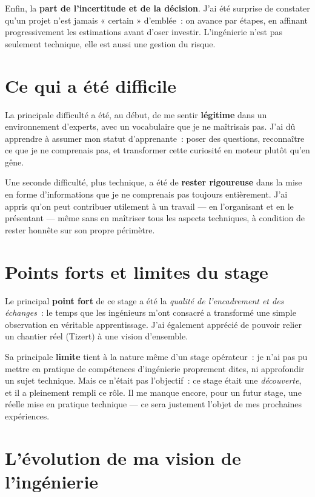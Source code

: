 \documentclass[12pt,a4paper,oneside]{report}
\begin{document}
Enfin, la \textbf{part de l'incertitude et de la décision}. J'ai été surprise de constater qu'un projet n'est jamais « certain » d'emblée~: on avance par étapes, en affinant progressivement les estimations avant d'oser investir. L'ingénierie n'est pas seulement technique, elle est aussi une gestion du risque.

\section{Ce qui a été difficile}

La principale difficulté a été, au début, de me sentir \textbf{légitime} dans un environnement d'experts, avec un vocabulaire que je ne maîtrisais pas. J'ai dû apprendre à assumer mon statut d'apprenante~: poser des questions, reconnaître ce que je ne comprenais pas, et transformer cette curiosité en moteur plutôt qu'en gêne.

Une seconde difficulté, plus technique, a été de \textbf{rester rigoureuse} dans la mise en forme d'informations que je ne comprenais pas toujours entièrement. J'ai appris qu'on peut contribuer utilement à un travail --- en l'organisant et en le présentant --- même sans en maîtriser tous les aspects techniques, à condition de rester honnête sur son propre périmètre.

\section{Points forts et limites du stage}

Le principal \textbf{point fort} de ce stage a été la \emph{qualité de l'encadrement et des échanges}~: le temps que les ingénieurs m'ont consacré a transformé une simple observation en véritable apprentissage. J'ai également apprécié de pouvoir relier un chantier réel (Tizert) à une vision d'ensemble.

Sa principale \textbf{limite} tient à la nature même d'un stage opérateur~: je n'ai pas pu mettre en pratique de compétences d'ingénierie proprement dites, ni approfondir un sujet technique. Mais ce n'était pas l'objectif~: ce stage était une \emph{découverte}, et il a pleinement rempli ce rôle. Il me manque encore, pour un futur stage, une réelle mise en pratique technique --- ce sera justement l'objet de mes prochaines expériences.

\section{L'évolution de ma vision de l'ingénierie}
\end{document}
